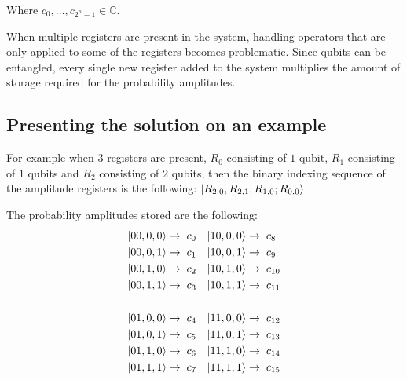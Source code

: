 Where $c_0,\dots{},c_{2^n-1}\in{}\mathds{C}$.

When multiple registers are present in the system, handling operators that are only applied to some of the registers becomes problematic. Since qubits can be entangled, every single new register added to the system multiplies the amount of storage required for the probability amplitudes.

\subsection{Presenting the solution on an example}

For example when 3 registers are present, $R_0$ consisting of $1$ qubit, $R_1$ consisting of $1$ qubits and $R_2$ consisting of $2$ qubits, then the binary indexing sequence of the amplitude registers is the following: $\ket{R_{2,0},R_{2,1};R_{1,0};R_{0,0}}$.

The probability amplitudes stored are the following:
\begin{align*}
\ket{00,0,0} \rightarrow & \hspace{2mm} c_{0} &
\ket{10,0,0} \rightarrow & \hspace{2mm} c_{8} \\
\ket{00,0,1} \rightarrow & \hspace{2mm} c_{1} &
\ket{10,0,1} \rightarrow & \hspace{2mm} c_{9} \\
\ket{00,1,0} \rightarrow & \hspace{2mm} c_{2} &
\ket{10,1,0} \rightarrow & \hspace{2mm} c_{10} \\
\ket{00,1,1} \rightarrow & \hspace{2mm} c_{3} &
\ket{10,1,1} \rightarrow & \hspace{2mm} c_{11} \\
\\
\ket{01,0,0} \rightarrow & \hspace{2mm} c_{4} &
\ket{11,0,0} \rightarrow & \hspace{2mm} c_{12} \\
\ket{01,0,1} \rightarrow & \hspace{2mm} c_{5} &
\ket{11,0,1} \rightarrow & \hspace{2mm} c_{13} \\
\ket{01,1,0} \rightarrow & \hspace{2mm} c_{6} &
\ket{11,1,0} \rightarrow & \hspace{2mm} c_{14} \\
\ket{01,1,1} \rightarrow & \hspace{2mm} c_{7} &
\ket{11,1,1} \rightarrow & \hspace{2mm} c_{15} \\
\end{align*}

